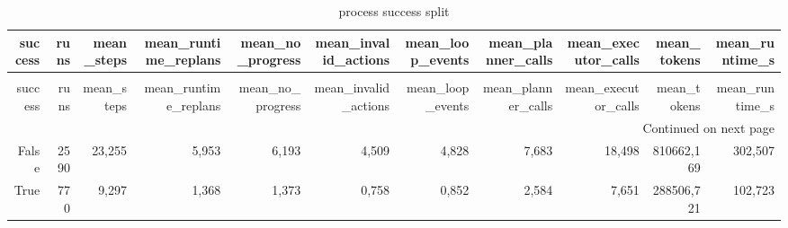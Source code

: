 \begin{longtable}{rrrrrrrrrrr}
\caption{process success split} \label{tab:process_success_split} \\
\toprule
success & runs & mean\_steps & mean\_runtime\_replans & mean\_no\_progress & mean\_invalid\_actions & mean\_loop\_events & mean\_planner\_calls & mean\_executor\_calls & mean\_tokens & mean\_runtime\_s \\
\midrule
\endfirsthead
\caption[]{process success split} \\
\toprule
success & runs & mean\_steps & mean\_runtime\_replans & mean\_no\_progress & mean\_invalid\_actions & mean\_loop\_events & mean\_planner\_calls & mean\_executor\_calls & mean\_tokens & mean\_runtime\_s \\
\midrule
\endhead
\midrule
\multicolumn{11}{r}{Continued on next page} \\
\midrule
\endfoot
\bottomrule
\endlastfoot
False & 2590 & 23,255 & 5,953 & 6,193 & 4,509 & 4,828 & 7,683 & 18,498 & 810662,169 & 302,507 \\
True & 770 & 9,297 & 1,368 & 1,373 & 0,758 & 0,852 & 2,584 & 7,651 & 288506,721 & 102,723 \\
\end{longtable}
